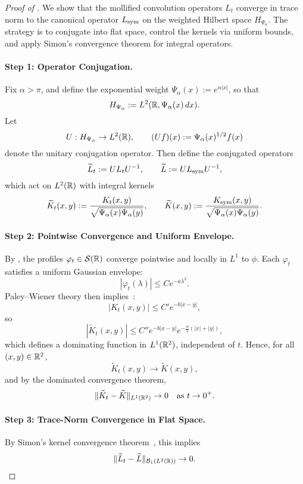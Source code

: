 \begin{proof}[Proof of ]
We show that the mollified convolution operators \( L_t \) converge in trace norm to the canonical operator \( L_{\mathrm{sym}} \) on the weighted Hilbert space \( H_{\Psi_\alpha} \). The strategy is to conjugate into flat space, control the kernels via uniform bounds, and apply Simon’s convergence theorem for integral operators.

\paragraph{Step 1: Operator Conjugation.}
Fix \( \alpha > \pi \), and define the exponential weight \( \Psi_\alpha(x) := e^{\alpha |x|} \), so that
\[
H_{\Psi_\alpha} := L^2(\mathbb{R}, \Psi_\alpha(x)\, dx).
\]
Let
\[
U : H_{\Psi_\alpha} \to L^2(\mathbb{R}), \qquad (Uf)(x) := \Psi_\alpha(x)^{1/2} f(x)
\]
denote the unitary conjugation operator. Then define the conjugated operators
\[
\widetilde{L}_t := U L_t U^{-1}, \qquad \widetilde{L} := U L_{\mathrm{sym}} U^{-1},
\]
which act on \( L^2(\mathbb{R}) \) with integral kernels
\[
\widetilde{K}_t(x, y) := \frac{K_t(x, y)}{\sqrt{\Psi_\alpha(x) \Psi_\alpha(y)}}, \qquad
\widetilde{K}(x, y) := \frac{K_{\mathrm{sym}}(x, y)}{\sqrt{\Psi_\alpha(x) \Psi_\alpha(y)}}.
\]

\paragraph{Step 2: Pointwise Convergence and Uniform Envelope.}
By , the profiles \( \varphi_t \in \mathcal{S}(\mathbb{R}) \) converge pointwise and locally in \( L^1 \) to \( \phi \). Each \( \varphi_t \) satisfies a uniform Gaussian envelope:
\[
|\varphi_t(\lambda)| \le C e^{-a\lambda^2}.
\]
Paley--Wiener theory then implies~\cite[Thm.~IX.12]{ReedSimon1975II}:
\[
|K_t(x,y)| \le C' e^{-b|x - y|},
\]
so
\[
|\widetilde{K}_t(x, y)| \le C'' e^{-b|x - y|} e^{-\frac{\alpha}{2}(|x| + |y|)},
\]
which defines a dominating function in \( L^1(\mathbb{R}^2) \), independent of \( t \). Hence, for all \( (x,y) \in \mathbb{R}^2 \),
\[
\widetilde{K}_t(x, y) \to \widetilde{K}(x, y),
\]
and by the dominated convergence theorem,
\[
\| \widetilde{K}_t - \widetilde{K} \|_{L^1(\mathbb{R}^2)} \to 0 \quad \text{as } t \to 0^+.
\]

\paragraph{Step 3: Trace-Norm Convergence in Flat Space.}
By Simon’s kernel convergence theorem~\cite[Thm.~3.1]{Simon2005TraceIdeals}, this implies
\[
\| \widetilde{L}_t - \widetilde{L} \|_{\mathcal{B}_1(L^2(\mathbb{R}))} \to 0.
\]


\end{proof}
